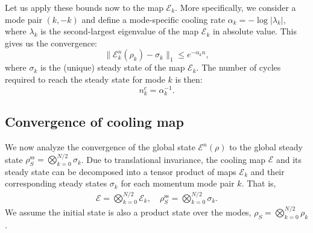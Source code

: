 Let us apply these bounds now to the map $\mathcal{E}_k$. More specifically, we consider a mode pair $(k,-k)$ and define a mode-specific cooling rate $\alpha_k = -\log |\lambda_k|$, where $\lambda_k$ is the second-largest eigenvalue of the map $\mathcal{E}_k$ in absolute value. This gives us the convergence:
\begin{equation}
    \|\mathcal{E}_k^n(\rho_k) - \sigma_k\|_1 \leq e^{-\alpha_k n},
    \label{eq:mode_convergence_rate}
\end{equation}
where $\sigma_k$ is the (unique) steady state of the map $\mathcal{E}_k$.
The number of cycles required to reach the steady state for mode $k$ is then:
\begin{equation}
    n^c_k = \alpha_k^{-1}.
    \label{eq:n0k_app}
\end{equation}

\subsection{Convergence of cooling map}
\label{subsec:global_convergence}

We now analyze the convergence of the global state $\mathcal{E}^n(\rho)$ to the global steady state $\rho_{S}^\text{ss} = \bigotimes_{k=0}^{N/2} \sigma_k$. Due to translational invariance, the cooling map $\mathcal{E}$ and its steady state can be decomposed into a tensor product of maps $\mathcal{E}_k$ and their corresponding steady states $\sigma_k$ for each momentum mode pair $k$. That is,
\begin{align}
    \mathcal{E}=\bigotimes_{k=0}^{N/2} \mathcal{E}_k, \quad \rho_{S}^\text{ss} = \bigotimes_{k=0}^{N/2} \sigma_k.
\end{align}
We assume the initial state is also a product state over the modes, $\rho_S = \bigotimes_{k=0}^{N/2} \rho_k$.

